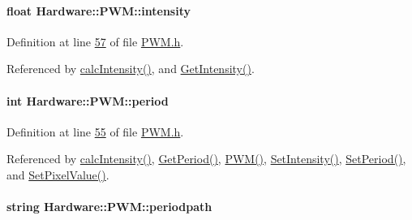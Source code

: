 \paragraph[{intensity}]{\setlength{\rightskip}{0pt plus 5cm}float Hardware\+::\+P\+W\+M\+::intensity\hspace{0.3cm}{\ttfamily [private]}}\label{class_hardware_1_1_p_w_m_afcfc81ddeeb9c510ad4d00b215477d7a}


Definition at line \hyperlink{_p_w_m_8h_source_l00057}{57} of file \hyperlink{_p_w_m_8h_source}{P\+W\+M.\+h}.



Referenced by \hyperlink{_p_w_m_8cpp_source_l00070}{calc\+Intensity()}, and \hyperlink{_p_w_m_8h_source_l00035}{Get\+Intensity()}.

\hypertarget{class_hardware_1_1_p_w_m_a91323a511e37d396f46d08f4159ef761}{}
\paragraph[{period}]{\setlength{\rightskip}{0pt plus 5cm}int Hardware\+::\+P\+W\+M\+::period\hspace{0.3cm}{\ttfamily [private]}}\label{class_hardware_1_1_p_w_m_a91323a511e37d396f46d08f4159ef761}


Definition at line \hyperlink{_p_w_m_8h_source_l00055}{55} of file \hyperlink{_p_w_m_8h_source}{P\+W\+M.\+h}.



Referenced by \hyperlink{_p_w_m_8cpp_source_l00070}{calc\+Intensity()}, \hyperlink{_p_w_m_8h_source_l00038}{Get\+Period()}, \hyperlink{_p_w_m_8cpp_source_l00015}{P\+W\+M()}, \hyperlink{_p_w_m_8cpp_source_l00090}{Set\+Intensity()}, \hyperlink{_p_w_m_8cpp_source_l00114}{Set\+Period()}, and \hyperlink{_p_w_m_8cpp_source_l00102}{Set\+Pixel\+Value()}.

\hypertarget{class_hardware_1_1_p_w_m_a27e17a6c2e9720c571d5939f1a9ffb12}{}
\paragraph[{periodpath}]{\setlength{\rightskip}{0pt plus 5cm}string Hardware\+::\+P\+W\+M\+::periodpath\hspace{0.3cm}{\ttfamily [private]}}\label{class_hardware_1_1_p_w_m_a27e17a6c2e9720c571d5939f1a9ffb12}


